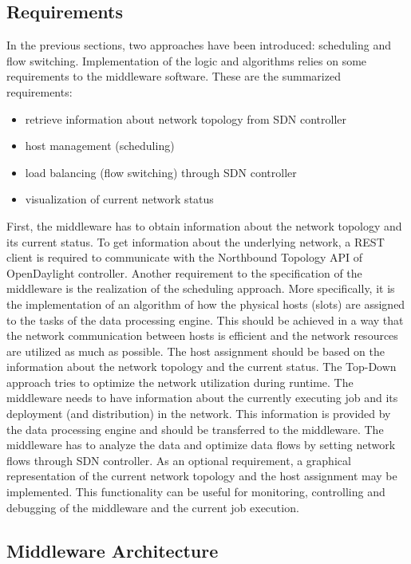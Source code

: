 \subsection{Requirements}
In the previous sections, two approaches have been introduced: scheduling and flow switching.
Implementation of the logic and algorithms relies on some requirements to the middleware software.
These are the summarized requirements:
\begin{itemize}
	\item retrieve information about network topology from SDN controller
	\item host management (scheduling)
	\item load balancing (flow switching) through SDN controller
	\item visualization of current network status
\end{itemize}
First, the middleware has to obtain information about the network topology and its current status.
To get information about the underlying network, a REST client is required to communicate with the
Northbound Topology API of OpenDaylight controller. Another requirement to the specification of the
middleware is the realization of the scheduling approach. More specifically, it is the implementation of an
algorithm of how the physical hosts (slots) are assigned to the tasks of the data processing engine.
This should be achieved in a way that the network communication between hosts is efficient and the
network resources are utilized as much as possible. The host assignment should be based on the
information about the network topology and the current status. The Top-Down approach tries to
optimize the network utilization during runtime. The middleware needs to have information about the
currently executing job and its deployment (and distribution) in the network. This information is
provided by the data processing engine and should be transferred to the middleware. The middleware
has to analyze the data and optimize data flows by setting network flows through SDN controller. As
an optional requirement, a graphical representation of the current network topology and the host
assignment may be implemented. This functionality can be useful for monitoring, controlling and
debugging of the middleware and the current job execution.

\subsection{Middleware Architecture}

